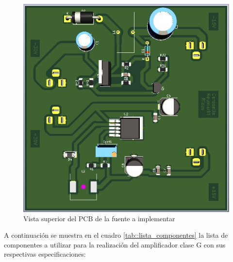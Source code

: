 \begin{figure}[H]
        \centering
        \includegraphics[scale=0.3]{./PCB_fuente2.jpeg}
        \caption{Vista superior del PCB de la fuente a implementar}
        \label{fig::PCB2}
\end{figure}


\par A continuación se muestra en el cuadro \ref{tab::lista_componentes} la lista de componentes a utilizar para la realización del amplificador clase G con sus respectivas especificaciones:\\

